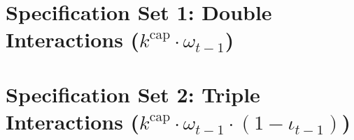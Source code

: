 \documentclass[11pt,a4paper]{article}
\begin{document}
\FloatBarrier


\FloatBarrier
\section{Specification Set 1: Double Interactions ($k^{\text{cap}} \cdot \omega_{t-1}$)}
\FloatBarrier


\FloatBarrier
\section{Specification Set 2: Triple Interactions ($k^{\text{cap}} \cdot \omega_{t-1} \cdot (1-\iota_{t-1})$)}
\FloatBarrier

\end{document}
